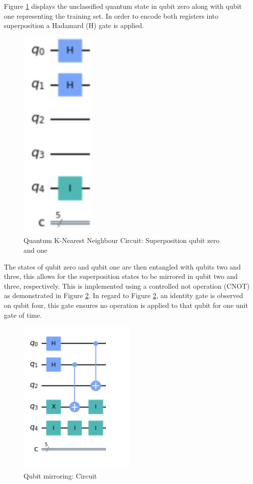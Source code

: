 Figure \ref{QSUP01} displays the unclassified quantum state in qubit zero along with qubit one representing the training set. 
In order to encode both registers into superposition a Hadamard (H) gate is applied. 
\begin{figure}[H]
      \centering
      \includegraphics[scale=0.4]{background/sup01.png}
      \caption{Quantum K-Nearest Neighbour Circuit: Superposition qubit zero and one}
      \label{QSUP01}
\end{figure}
The states of qubit zero and qubit one are then entangled with qubits two and three, this allows for the superposition states to be mirrored in qubit two and three, respectively. This is implemented using a controlled not operation (CNOT) as demonstrated in Figure \ref{QMir}. In regard to Figure \ref{QMir}, an identity gate is observed on qubit four, this gate ensures no operation is applied to that qubit for one unit gate of time.


\begin{figure}[H]
      \centering
      \includegraphics[scale=0.7]{background/Copy23.png}
      \caption{Qubit mirroring: Circuit}
      \label{QMir}
\end{figure}


